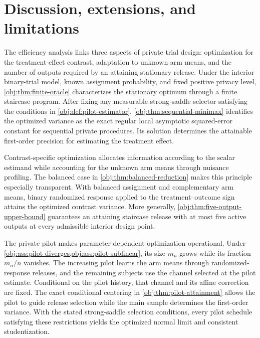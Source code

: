 \section{Discussion, extensions, and limitations}

The efficiency analysis links three aspects of private trial design: optimization for the treatment-effect contrast, adaptation to unknown arm means, and the number of outputs required by an attaining stationary release. Under the interior binary-trial model, known assignment probability, and fixed positive privacy level, \cref{obj:thm:finite-oracle} characterizes the stationary optimum through a finite staircase program. After fixing any measurable strong-saddle selector satisfying the conditions in \cref{obj:def:pilot-estimator}, \cref{obj:thm:sequential-minimax} identifies the optimized variance as the exact regular local asymptotic squared-error constant for sequential private procedures. Its solution determines the attainable first-order precision for estimating the treatment effect.

Contrast-specific optimization allocates information according to the scalar estimand while accounting for the unknown arm means through nuisance profiling. The balanced case in \cref{obj:thm:balanced-reduction} makes this principle especially transparent. With balanced assignment and complementary arm means, binary randomized response applied to the treatment--outcome sign attains the optimized contrast variance. More generally, \cref{obj:thm:five-output-upper-bound} guarantees an attaining staircase release with at most five active outputs at every admissible interior design point.

The private pilot makes parameter-dependent optimization operational. Under \cref{obj:ass:pilot-diverges,obj:ass:pilot-sublinear}, its size \(m_n\) grows while its fraction \(m_n/n\) vanishes. The increasing pilot learns the arm means through randomized-response releases, and the remaining subjects use the channel selected at the pilot estimate. Conditional on the pilot history, that channel and its affine correction are fixed. The exact conditional centering in \cref{obj:thm:pilot-attainment} allows the pilot to guide release selection while the main sample determines the first-order variance. With the stated strong-saddle selection conditions, every pilot schedule satisfying these restrictions yields the optimized normal limit and consistent studentization.

